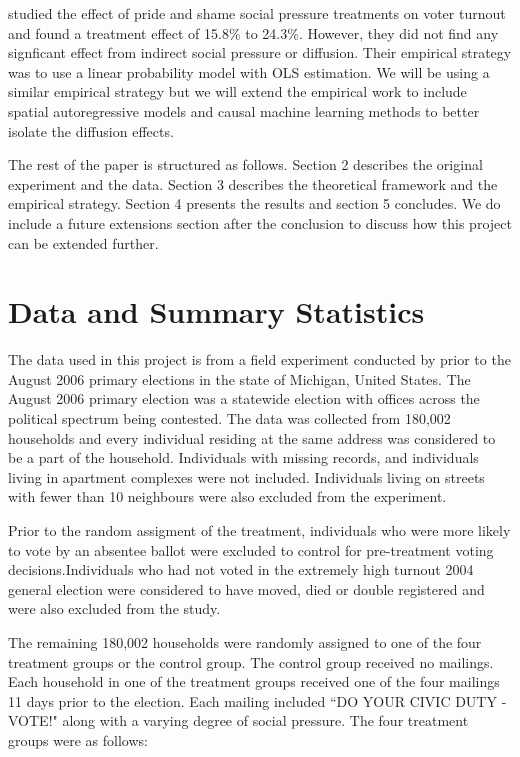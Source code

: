 \documentclass[11pt, draft]{article}
\begin{document}
\cite{haenschen_social_2016} studied the effect of pride and shame social pressure treatments on voter turnout and found a treatment effect of 15.8\% to 24.3\%. However, they did not find any signficant effect from indirect social pressure or diffusion. Their empirical strategy was to use a linear probability model with OLS estimation. We will be using a similar empirical strategy but we will extend the empirical work to include spatial autoregressive models and causal machine learning methods to better isolate the diffusion effects.

The rest of the paper is structured as follows. Section 2 describes the original experiment and the data. Section 3 describes the theoretical framework and the empirical strategy. Section 4 presents the results and section 5 concludes. We do include a future extensions section after the conclusion to discuss how this project can be extended further.

\section{Data and Summary Statistics}
The data used in this project is from a field experiment conducted by \cite{gerber_social_2008} prior to the August 2006 primary elections in the state of Michigan, United States. The August 2006 primary election was a statewide election with offices across the political spectrum being contested. The data was collected from 180,002 households and every individual residing at the same address was considered to be a part of the household. Individuals with missing records, and individuals living in apartment complexes were not included. Individuals living on streets with fewer than 10 neighbours were also excluded from the experiment.

Prior to the random assigment of the treatment, individuals who were more likely to vote by an absentee ballot were excluded to control for pre-treatment voting decisions.Individuals who had not voted in the extremely high turnout 2004 general election were considered to have moved, died or double registered and were also excluded from the study.

The remaining 180,002 households were randomly assigned to one of the four treatment groups or the control group. The control group received no mailings. Each household in one of the treatment groups received one of the four mailings 11 days prior to the election. Each mailing included ``DO YOUR CIVIC DUTY - VOTE!" along with a varying degree of social pressure. The four treatment groups were as follows:
\end{document}
